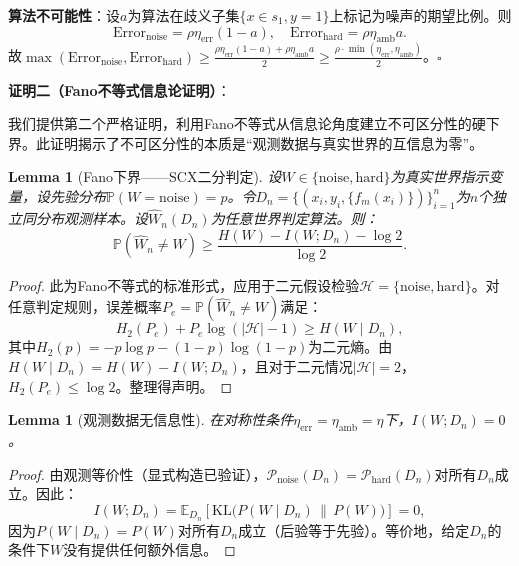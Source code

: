 \documentclass[12pt,a4paper]{ctexart}
\newtheorem{lemma}[theorem]{Lemma}
\theoremstyle{definition}
\theoremstyle{remark}
\begin{document}
\textbf{算法不可能性}：设$a$为算法在歧义子集$\{x\in s_1, y=1\}$上标记为噪声的期望比例。则
\begin{equation}
\mathrm{Error}_{\text{noise}} = \rho\eta_{\text{err}}(1-a), \quad \mathrm{Error}_{\text{hard}} = \rho\eta_{\text{amb}} a.
\end{equation}
故$\max(\mathrm{Error}_{\text{noise}}, \mathrm{Error}_{\text{hard}}) \geq \frac{\rho\eta_{\text{err}}(1-a) + \rho\eta_{\text{amb}} a}{2} \geq \frac{\rho \cdot \min(\eta_{\text{err}}, \eta_{\text{amb}})}{2}$。\hfill$\square$

\bigskip
\textbf{证明二（Fano不等式信息论证明）}：

我们提供第二个严格证明，利用Fano不等式从信息论角度建立不可区分性的硬下界。此证明揭示了不可区分性的本质是``观测数据与真实世界的互信息为零''。

\begin{lemma}[Fano下界——SCX二分判定]
\label{lem:fano-thm3}
设$W \in \{\text{noise}, \text{hard}\}$为真实世界指示变量，设先验分布$\mathbb{P}(W = \text{noise}) = p$。令$D_n = \{(x_i, y_i, \{f_m(x_i)\})\}_{i=1}^n$为$n$个独立同分布观测样本。设$\hat{W}_n(D_n)$为任意世界判定算法。则：
\begin{equation}
\mathbb{P}(\hat{W}_n \neq W) \geq \frac{H(W) - I(W; D_n) - \log 2}{\log 2}.
\end{equation}
\end{lemma}
\begin{proof}
此为Fano不等式的标准形式\cite{fano1961,cover2006}，应用于二元假设检验$\mathcal{H} = \{\text{noise}, \text{hard}\}$。对任意判定规则，误差概率$P_e = \mathbb{P}(\hat{W}_n \neq W)$满足：
\begin{equation}
H_2(P_e) + P_e \log(|\mathcal{H}|-1) \geq H(W \mid D_n),
\end{equation}
其中$H_2(p) = -p\log p - (1-p)\log(1-p)$为二元熵。由$H(W \mid D_n) = H(W) - I(W; D_n)$，且对于二元情况$|\mathcal{H}|=2$，$H_2(P_e) \leq \log 2$。整理得声明。
\end{proof}

\begin{lemma}[观测数据无信息性]
\label{lem:zero-mi}
在对称性条件$\eta_{\text{err}} = \eta_{\text{amb}} = \eta$下，$I(W; D_n) = 0$。
\end{lemma}
\begin{proof}
由观测等价性（显式构造已验证），$\mathcal{P}_{\text{noise}}(D_n) = \mathcal{P}_{\text{hard}}(D_n)$对所有$D_n$成立。因此：
\begin{equation}
I(W; D_n) = \mathbb{E}_{D_n}\left[\mathrm{KL}\big(P(W \mid D_n) \,\big\|\, P(W)\big)\right] = 0,
\end{equation}
因为$P(W \mid D_n) = P(W)$对所有$D_n$成立（后验等于先验）。等价地，给定$D_n$的条件下$W$没有提供任何额外信息。
\end{proof}
\end{document}
